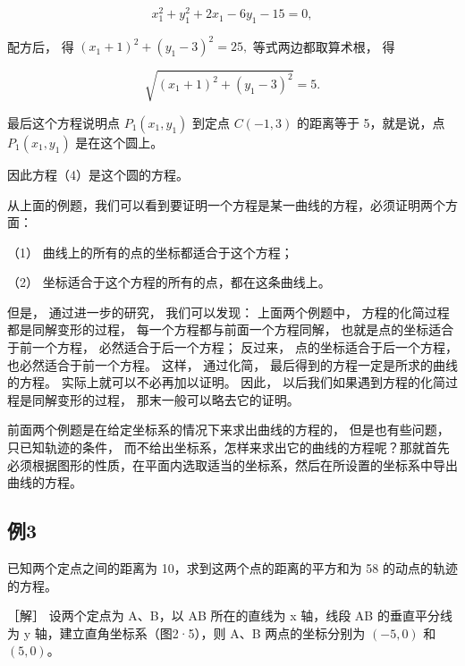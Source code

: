\[
x_{1} ^ {2} + y_{1} ^ {2} + 2 x_{1} - 6 y_{1} - 15 = 0,
\]

配方后， 得 \((x_{1}+1)^{2}+(y_{1}-3)^{2}=25,\) 等式两边都取算术根， 得

\[
\sqrt {\left(x_{1} + 1\right) ^ {2} + \left(y_{1} - 3\right) ^ {2}} = 5.
\]

最后这个方程说明点 \(P_{1}(x_{1}, y_{1})\) 到定点 \(C(-1, 3)\)
的距离等于 5，就是说，点 \(P_{1}(x_{1}, y_{1})\) 是在这个圆上。

因此方程（4）是这个圆的方程。

从上面的例题，我们可以看到要证明一个方程是某一曲线的方程，必须证明两个方面：

（1） 曲线上的所有的点的坐标都适合于这个方程；

（2） 坐标适合于这个方程的所有的点，都在这条曲线上。

但是， 通过进一步的研究， 我们可以发现： 上面两个例题中，
方程的化简过程都是同解变形的过程， 每一个方程都与前面一个方程同解，
也就是点的坐标适合于前一个方程， 必然适合于后一个方程； 反过来，
点的坐标适合于后一个方程， 也必然适合于前一个方程。 这样， 通过化简，
最后得到的方程一定是所求的曲线的方程。 实际上就可以不必再加以证明。
因此， 以后我们如果遇到方程的化简过程是同解变形的过程，
那末一般可以略去它的证明。

前面两个例题是在给定坐标系的情况下来求出曲线的方程的， 但是也有些问题，
只已知轨迹的条件，
而不给出坐标系，怎样来求出它的曲线的方程呢？那就首先必须根据图形的性质，在平面内选取适当的坐标系，然后在所设置的坐标系中导出曲线的方程。

\subsection{例3}\label{ux4f8b3-6}

已知两个定点之间的距离为 10，求到这两个点的距离的平方和为 58
的动点的轨迹的方程。

［解］ 设两个定点为 A、B，以 AB 所在的直线为 x 轴，线段 AB
的垂直平分线为 y 轴，建立直角坐标系（图2·5），则 A、B 两点的坐标分别为
\((-5,0)\) 和 \((5,0)\)。

